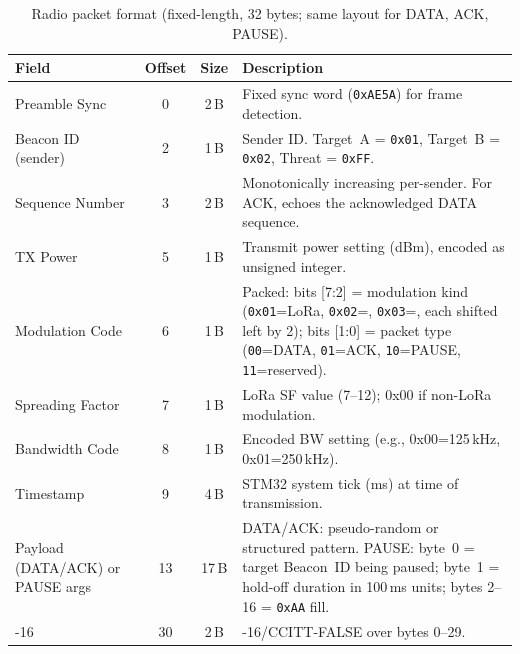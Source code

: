 \documentclass[11pt,letterpaper]{article}
\begin{document}
	\begin{table}[ht!]
		\centering
		\caption{Radio packet format (fixed-length, 32 bytes; same layout for DATA, ACK, PAUSE).}
		\label{tab:packet}
		\renewcommand{\arraystretch}{1.3}
		\begin{tabularx}{\textwidth}{l c c X}
			\toprule
			\textbf{Field} & \textbf{Offset} & \textbf{Size} & \textbf{Description} \\
			\midrule
			Preamble Sync & 0 & 2\,B & Fixed sync word (\texttt{0xAE5A}) for frame detection. \\
			Beacon ID (sender) & 2 & 1\,B & Sender ID. Target~A = \texttt{0x01}, Target~B = \texttt{0x02}, Threat = \texttt{0xFF}. \\
			Sequence Number & 3 & 2\,B & Monotonically increasing per-sender. For ACK, echoes the acknowledged DATA sequence. \\
			TX Power & 5 & 1\,B & Transmit power setting (dBm), encoded as unsigned integer. \\
			Modulation Code & 6 & 1\,B & Packed: bits [7:2] = modulation kind (\texttt{0x01}=LoRa, \texttt{0x02}=\FSK{}, \texttt{0x03}=\OOK{}, each shifted left by 2); bits [1:0] = packet type (\texttt{00}=DATA, \texttt{01}=ACK, \texttt{10}=PAUSE, \texttt{11}=reserved). \\
			Spreading Factor & 7 & 1\,B & LoRa SF value (7--12); 0x00 if non-LoRa modulation. \\
			Bandwidth Code & 8 & 1\,B & Encoded BW setting (e.g., 0x00=125\,kHz, 0x01=250\,kHz). \\
			Timestamp & 9 & 4\,B & STM32 system tick (ms) at time of transmission. \\
			Payload (DATA/ACK) or PAUSE args & 13 & 17\,B & DATA/ACK: pseudo-random or structured pattern. PAUSE: byte~0 = target Beacon~ID being paused; byte~1 = hold-off duration in 100\,ms units; bytes 2--16 = \texttt{0xAA} fill. \\
			\CRC{}-16 & 30 & 2\,B & \CRC{}-16/CCITT-FALSE over bytes 0--29. \\
			\bottomrule
		\end{tabularx}
	\end{table}
\end{document}
